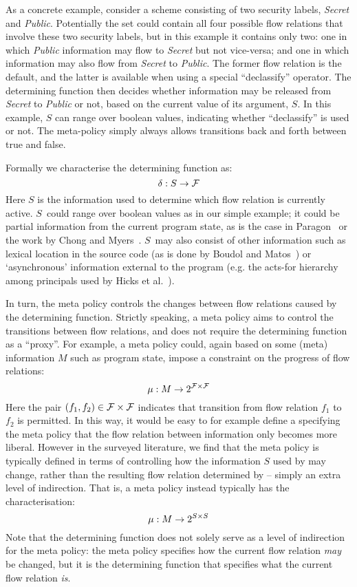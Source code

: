 As a concrete example, consider a scheme consisting of two security labels, \emph{Secret} and \emph{Public}.
Potentially the set \orderings{} could contain all four possible flow relations that involve these 
two security labels, but in this example it contains only two:
one in which \emph{Public} information may flow to \emph{Secret} but not vice-versa; 
and one in which information may also flow from \emph{Secret} to \emph{Public}.
The former flow relation is the default, and the latter is available when using
a special ``declassify'' operator.
The determining function \dynamicpol{} then decides whether information may be released from 
\emph{Secret} to \emph{Public} or not, based on the current value of its argument, $S$. In
this example, $S$ can range over boolean values, indicating whether ``declassify'' is used
or not. The meta-policy simply always allows transitions back and
forth between true and false.





Formally we characterise the determining function as:
\[
  \delta{} : S \rightarrow \mathcal{F}{}
\]
Here $S$ is the information used to determine which flow relation is currently active.
$S$~could range over boolean values as in our simple example; it could be partial information from the current program state, as is the case in Paragon~\cite{Paragon} or the work by Chong and Myers~\cite{Chong:Myers:CCS04}.
$S$~may also consist of other information such as lexical location in the source code (as is done by Boudol and Matos~\cite{Boudol:Matos:On}) or `asynchronous' information external to the program (e.g. the acts-for hierarchy among principals used by Hicks et al.~\cite{Hicks+:Dynamic}).

In turn, the meta policy controls the changes between flow relations caused by the determining function.
Strictly speaking, a meta policy aims to control the transitions between flow relations, and does not
require the determining function as a ``proxy''. For example, a meta policy could, again based on some 
(meta) information $M$ such as program state, impose a constraint on the progress of flow relations:
\[
  \mu{} : M \rightarrow 2^{\mathcal{F}{} \times \mathcal{F}{}}
\]
Here the pair $(f_1, f_2) \in \mathcal{F}{} \times \mathcal{F}{}$ indicates that transition from flow 
relation $f_1$ to $f_2$ is permitted. In this way, it would be easy to for example define a \metapol{}
specifying the meta policy that the flow relation between information only becomes more liberal.
However in the surveyed literature, we find that the meta policy is typically defined in terms of
controlling how the information $S$ used by \dynamicpol{} may change, rather than the resulting
flow relation determined by \dynamicpol{} -- simply an extra level of indirection.
That is, a meta policy instead typically has the characterisation:
\[
  \mu{} : M \rightarrow 2^{S \times S}
\]
Note that the determining function does not solely serve as a level of indirection for the meta policy:
the meta policy specifies how the current flow relation \emph{may} be changed, but it is the determining function that specifies what the current flow relation \emph{is}.


